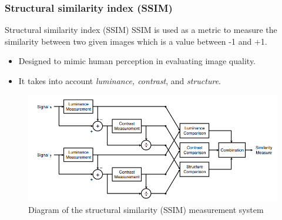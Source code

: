 \documentclass[13.5pt,aspecratio=169, xcolor=dvipsnames]{beamer}
\begin{document}
\begin{frame}
    \onehalfspacing
        \frametitle{Structural similarity index (SSIM)}
        
        \begin{block}{Structural similarity index (SSIM)}
            SSIM is used as a metric to measure the similarity between two given images which is a value between -1 and +1.
            \begin{itemize}
            \item Designed to mimic human perception in evaluating image quality.
            \item It takes into account \textit{luminance, contrast}, and \textit{structure}.
            \end{itemize}
        \end{block}

        \begin{figure}[h]
            \centering
            \includegraphics[width=0.9\linewidth]{SSIM.png}
            \caption{Diagram of the structural similarity (SSIM) measurement system}
        \end{figure}
      
\end{frame}
    
\end{document}
